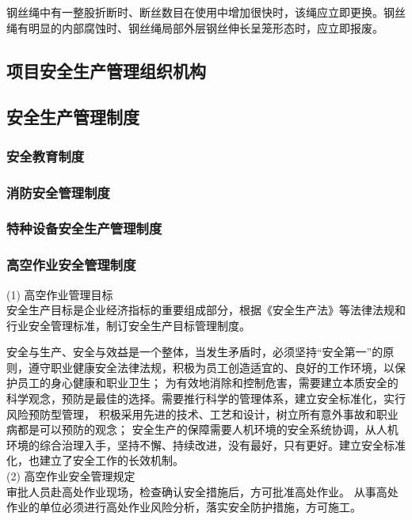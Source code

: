  钢丝绳中有一整股折断时、断丝数目在使用中增加很快时，该绳应立即更换。钢丝绳有明显的内部腐蚀时、钢丝绳局部外层钢丝伸长呈笼形态时，应立即报废。\\

\subsection{项目安全生产管理组织机构}

\subsection{安全生产管理制度}
\subsubsection{安全教育制度}

\subsubsection{消防安全管理制度}

\subsubsection{特种设备安全生产管理制度}

\subsubsection{高空作业安全管理制度}

(1) 高空作业管理目标\\

安全生产目标是企业经济指标的重要组成部分，根据《安全生产法》等法律法规和行业安全管理标准，制订安全生产目标管理制度。

安全与生产、安全与效益是一个整体，当发生矛盾时，必须坚持“安全第一”的原则，遵守职业健康安全法律法规，积极为员工创造适宜的、良好的工作环境，以保护员工的身心健康和职业卫生；
为有效地消除和控制危害，需要建立本质安全的科学观念，预防是最佳的选择。需要推行科学的管理体系，建立安全标准化，实行风险预防型管理，
积极采用先进的技术、工艺和设计，树立所有意外事故和职业病都是可以预防的观念；
安全生产的保障需要人机环境的安全系统协调，从人机环境的综合治理入手，坚持不懈、持续改进，没有最好，只有更好。建立安全标准化，也建立了安全工作的长效机制。\\

(2) 高空作业安全管理规定\\

 审批人员赴高处作业现场，检查确认安全措施后，方可批准高处作业。 从事高处作业的单位必须进行高处作业风险分析，落实安全防护措施，方可施工。

